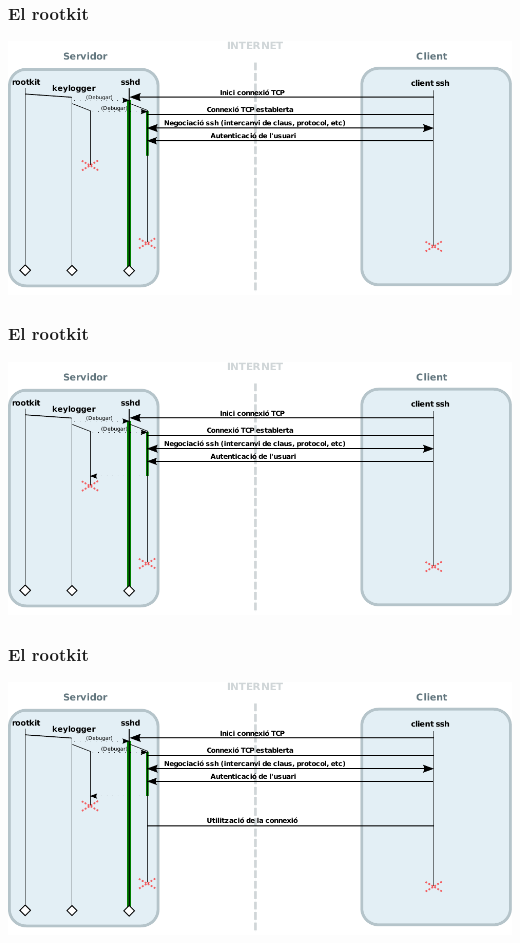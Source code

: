 \documentclass{beamer}
\begin{document}
\begin{frame}
	\frametitle{El rootkit}
	\includegraphics[scale=0.65,keepaspectratio]{sshd_keylogger_8.pdf}
\end{frame}

\begin{frame}
	\frametitle{El rootkit}
	\includegraphics[scale=0.65,keepaspectratio]{sshd_keylogger_9.pdf}
\end{frame}

\begin{frame}
	\frametitle{El rootkit}
	\includegraphics[scale=0.65,keepaspectratio]{sshd_keylogger_10.pdf}
\end{frame}
\end{document}
